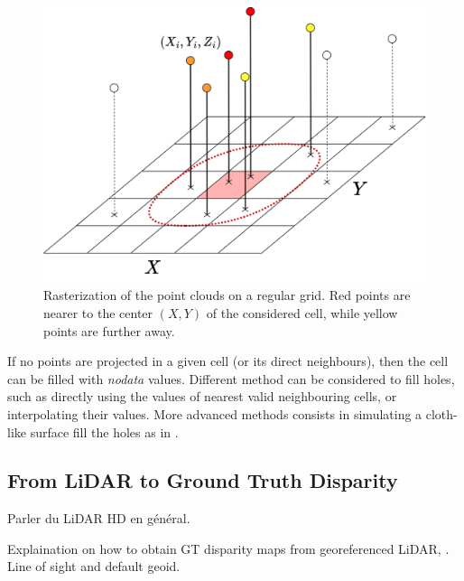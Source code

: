 \begin{figure}
    \centering
    \includegraphics[width=0.7\linewidth]{Images/Chap_1/Rasterization.png}
    \caption{Rasterization of the point clouds on a regular grid. Red points are nearer to the center $(X,Y)$ of the considered cell, while yellow points are further away.}
    \label{fig:rasterization}
\end{figure}

\begin{remark}
    If no points are projected in a given cell (or its direct neighbours), then the cell can be filled with \textit{nodata} values. Different method can be considered to fill holes, such as directly using the values of nearest valid neighbouring cells, or interpolating their values. More advanced methods consists in simulating a cloth-like surface fill the holes as in \cite{lallement_bulldozer_2022}.
\end{remark}

\subsection{From LiDAR to Ground Truth Disparity}
Parler du LiDAR HD en général. 

Explaination on how to obtain GT disparity maps from georeferenced LiDAR, \cite{cournet_ground_2020}. Line of sight and default geoid. 

